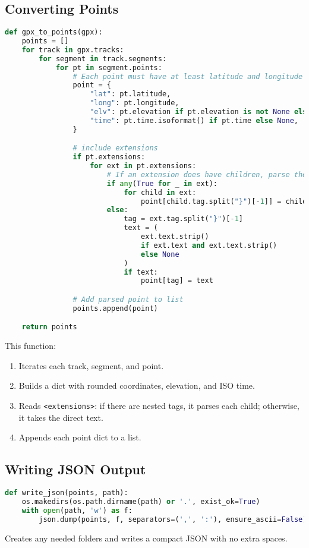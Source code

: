 \documentclass{article}
\begin{document}
\subsection{Converting Points}
\begin{lstlisting}[language=Python]
def gpx_to_points(gpx):
    points = []
    for track in gpx.tracks:
        for segment in track.segments:
            for pt in segment.points:
                # Each point must have at least latitude and longitude
                point = {
                    "lat": pt.latitude,
                    "long": pt.longitude,
                    "elv": pt.elevation if pt.elevation is not None else None,
                    "time": pt.time.isoformat() if pt.time else None,
                }

                # include extensions
                if pt.extensions:
                    for ext in pt.extensions:
                        # If an extension does have children, parse them individually, otherwise add the key:value pair directly
                        if any(True for _ in ext):
                            for child in ext:
                                point[child.tag.split("}")[-1]] = child.text
                        else:
                            tag = ext.tag.split("}")[-1]
                            text = (
                                ext.text.strip()
                                if ext.text and ext.text.strip()
                                else None
                            )
                            if text:
                                point[tag] = text

                # Add parsed point to list
                points.append(point)

    return points
\end{lstlisting}
This function:
\begin{enumerate}
	\item Iterates each track, segment, and point.
	\item Builds a dict with rounded coordinates, elevation, and ISO time.
	\item Reads \texttt{<extensions>}: if there are nested tags, it parses each child; otherwise, it takes the direct text.
	\item Appends each point dict to a list.
\end{enumerate}

\subsection{Writing JSON Output}
\begin{lstlisting}[language=Python]
def write_json(points, path):
    os.makedirs(os.path.dirname(path) or '.', exist_ok=True)
    with open(path, 'w') as f:
        json.dump(points, f, separators=(',', ':'), ensure_ascii=False)
\end{lstlisting}
Creates any needed folders and writes a compact JSON with no extra spaces.
\end{document}
